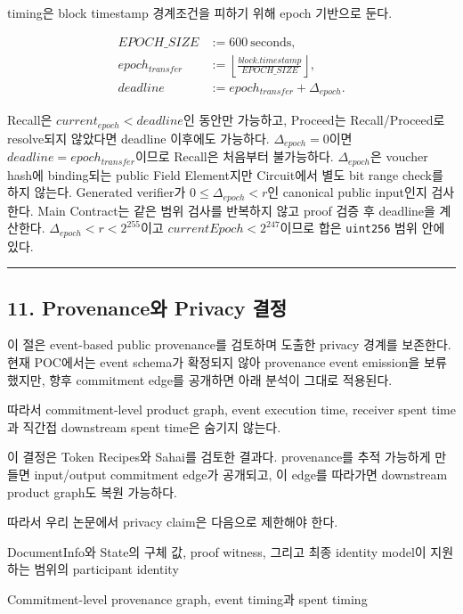 \documentclass[11pt]{extarticle}
\begin{document}
timing은 block timestamp 경계조건을 피하기 위해 epoch 기반으로 둔다.

\[
\begin{aligned}
EPOCH\_SIZE &:= 600\ \mathrm{seconds},\\
epoch_{transfer} &:=
\left\lfloor\frac{block.timestamp}{EPOCH\_SIZE}\right\rfloor,\\
deadline &:= epoch_{transfer}+\Delta_{epoch}.
\end{aligned}
\]

Recall은 $current_{epoch}<deadline$인 동안만 가능하고, Proceed는 Recall/Proceed로
resolve되지 않았다면 deadline 이후에도 가능하다. $\Delta_{epoch}=0$이면
$deadline=epoch_{transfer}$이므로 Recall은 처음부터 불가능하다. $\Delta_{epoch}$은
voucher hash에 binding되는 public Field Element지만 Circuit에서 별도 bit range check를
하지 않는다. Generated verifier가 $0\leq\Delta_{epoch}<r$인 canonical public input인지
검사한다. Main Contract는 같은 범위 검사를 반복하지 않고 proof 검증 후 deadline을
계산한다. $\Delta_{epoch}<r<2^{255}$이고 $currentEpoch<2^{247}$이므로 합은
\texttt{uint256} 범위 안에 있다.

\begin{center}\rule{0.5\linewidth}{0.5pt}\end{center}

\subsection{11. Provenance와 Privacy
결정}\label{11-provenanceuxc640-privacy-uxacb0uxc815}

이 절은 event-based public provenance를 검토하며 도출한 privacy 경계를 보존한다.
현재 POC에서는 event schema가 확정되지 않아 provenance event emission을 보류했지만,
향후 commitment edge를 공개하면 아래 분석이 그대로 적용된다.

따라서 commitment-level product graph, event execution time, receiver spent time과
직간접 downstream spent time은 숨기지 않는다.

이 결정은 Token Recipes와 Sahai를 검토한 결과다. provenance를 추적
가능하게 만들면 input/output commitment edge가 공개되고, 이 edge를
따라가면 downstream product graph도 복원 가능하다.

따라서 우리 논문에서 privacy claim은 다음으로 제한해야 한다.

\begin{description}[leftmargin=28mm,style=nextline]
  \item[숨기는 정보] DocumentInfo와 State의 구체 값, proof witness, 그리고 최종
  identity model이 지원하는 범위의 participant identity
  \item[숨기지 않는 정보] Commitment-level provenance graph, event timing과 spent timing
\end{description}
\end{document}
